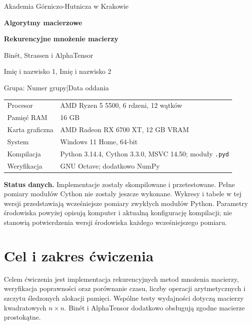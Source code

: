 \documentclass[11pt,a4paper]{article}
\newcommand{\autorzy}{Imię i nazwisko 1, Imię i nazwisko 2}
\newcommand{\grupa}{Numer grupy}
\newcommand{\dataoddania}{Data oddania}
\begin{document}
\begin{center}
  {\small Akademia Górniczo-Hutnicza w Krakowie}\par
  \vspace{8mm}
  {\Large\bfseries Algorytmy macierzowe}\par
  \vspace{3mm}
  {\LARGE\bfseries Rekurencyjne mnożenie macierzy}\par
  \vspace{3mm}
  {\large Binét, Strassen i AlphaTensor}\par
  \vspace{7mm}
  \autorzy\par
  Grupa: \grupa\quad |\quad \dataoddania
\end{center}
\vspace{5mm}

\begin{tabularx}{\linewidth}{@{}lX@{}}
\toprule
Procesor & AMD Ryzen 5 5500, 6 rdzeni, 12 wątków \\
Pamięć RAM & 16 GB \\
Karta graficzna & AMD Radeon RX 6700 XT, 12 GB VRAM \\
System & Windows 11 Home, 64-bit \\
Kompilacja & Python 3.14.4, Cython 3.3.0, MSVC 14.50; moduły \texttt{.pyd} \\
Weryfikacja & GNU Octave; dodatkowo NumPy \\
\bottomrule
\end{tabularx}

\vspace{4mm}
\textbf{Status danych.} Implementacje zostały skompilowane i przetestowane.
Pełne pomiary modułów Cython nie zostały jeszcze wykonane.
Wykresy i tabele w tej wersji przedstawiają wcześniejsze pomiary zwykłych
modułów Python. Parametry środowiska powyżej opisują komputer i aktualną
konfigurację kompilacji; nie stanowią potwierdzenia wersji środowiska
każdego wcześniejszego pomiaru.

\tableofcontents
\newpage

\section{Cel i zakres ćwiczenia}
Celem ćwiczenia jest implementacja rekurencyjnych metod mnożenia macierzy,
weryfikacja poprawności oraz porównanie czasu, liczby operacji arytmetycznych
i szczytu śledzonych alokacji pamięci.
Wspólne testy wydajności dotyczą macierzy kwadratowych $n\times n$.
Binét i AlphaTensor dodatkowo obsługują zgodne macierze prostokątne.
\end{document}

